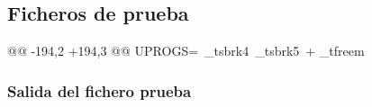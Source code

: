 \subsection{Ficheros de prueba}
\begin{listing}
@@ -194,2 +194,3 @@ UPROGS=\
    _tsbrk4\
    _tsbrk5\
+   _tfreem\
\end{listing}

\subsubsection{Salida del fichero prueba}
